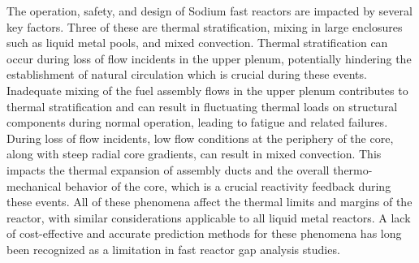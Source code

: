 

The operation, safety, and design of Sodium fast reactors are impacted by
several key factors. Three of these are thermal stratification, mixing in large
enclosures such as liquid metal pools, and mixed convection.
  Thermal stratification can occur during loss of flow incidents in the upper
plenum, potentially hindering the establishment of natural circulation which is
crucial during these events.
Inadequate mixing of the fuel assembly flows in the upper plenum contributes to
thermal stratification and can result in fluctuating thermal loads on
structural components during normal operation, leading to fatigue and related
failures.
  During loss of flow incidents, low flow conditions at the periphery of the
core, along with steep radial core gradients, can result in mixed convection.
This impacts the thermal expansion of assembly ducts and the overall
thermo-mechanical behavior of the core, which is a crucial reactivity feedback
during these events.
  All of these phenomena affect the thermal limits and margins of the reactor,
with similar considerations applicable to all liquid metal reactors. A lack of
cost-effective and accurate prediction methods for these phenomena has long
been recognized as a limitation in fast reactor gap analysis studies.


